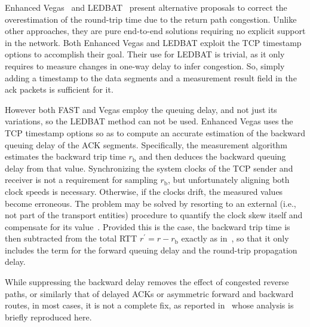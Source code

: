 \documentclass[english,times]{ettauth}
\begin{document}
Enhanced Vegas~\cite{Chan03} and LEDBAT~\cite{Shalunov10} present alternative
proposals to correct the overestimation of the round-trip time due to the
return path congestion. Unlike other approaches, they are pure end-to-end
solutions requiring no explicit support in the network. Both Enhanced Vegas
and LEDBAT exploit the TCP timestamp options to accomplish their goal. Their
use for LEDBAT is trivial, as it only requires to measure changes in one-way
delay to infer congestion. So, simply adding a timestamp to the data segments
and a measurement result field in the ack packets is sufficient for it.

However both FAST and Vegas employ the queuing delay, and not just its
variations, so the LEDBAT method can not be used. Enhanced Vegas uses the TCP
timestamp options so as to compute an accurate estimation of the backward
queuing delay of the ACK segments. Specifically, the measurement algorithm
estimates the backward trip time $r_\mathrm{b}$ and then deduces the backward
queuing delay from that value. Synchronizing the system clocks of the TCP
sender and receiver is not a requirement for sampling $r_\mathrm{b}$, but
unfortunately aligning both clock speeds is necessary. Otherwise, if the
clocks drift, the measured values become erroneous. The problem may be solved
by resorting to an external (i.e., not part of the transport entities)
procedure to quantify the clock skew itself and compensate for its
value~\cite{Moon99,Zhang02}. Provided this is the case, the backward trip time
is then subtracted from the total RTT $r^\prime = r - r_{\mathrm b}$ exactly
as in~\cite{Liu05}, so that it only includes the term for the forward queuing
delay and the round-trip propagation delay.



While suppressing the backward delay removes the effect of congested reverse
paths, or similarly that of delayed ACKs or asymmetric forward and backward
routes, in most cases, it is not a complete fix, as reported
in~\cite{Herreria07} whose analysis is briefly reproduced here.
\end{document}

